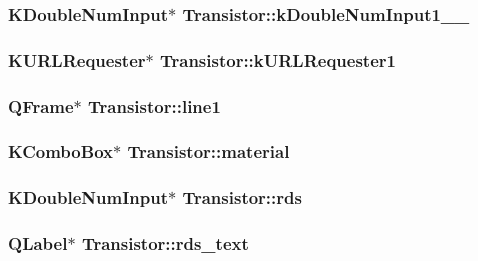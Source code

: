 \subsubsection{\setlength{\rightskip}{0pt plus 5cm}KDouble\-Num\-Input$\ast$ {\bf Transistor::k\-Double\-Num\-Input1\_\_}}\label{classTransistor_b179b3a77b3f159b9393a3fbb5445f24}


\subsubsection{\setlength{\rightskip}{0pt plus 5cm}KURLRequester$\ast$ {\bf Transistor::k\-URLRequester1}}\label{classTransistor_c0c3252833af084df07ac1cc38f7260e}


\subsubsection{\setlength{\rightskip}{0pt plus 5cm}QFrame$\ast$ {\bf Transistor::line1}}\label{classTransistor_137f72c3708c6bd0de00a0e5a69c699b}


\subsubsection{\setlength{\rightskip}{0pt plus 5cm}KCombo\-Box$\ast$ {\bf Transistor::material}}\label{classTransistor_eec34d804c9ce6c89cff596be555e6a4}


\subsubsection{\setlength{\rightskip}{0pt plus 5cm}KDouble\-Num\-Input$\ast$ {\bf Transistor::rds}}\label{classTransistor_1d374ed2a6bcf601d7bfd4fc3dfd3b5d}


\subsubsection{\setlength{\rightskip}{0pt plus 5cm}QLabel$\ast$ {\bf Transistor::rds\_\-text}}\label{classTransistor_34aaeae3ae1093daec7b9e87adc1d75a}


